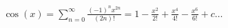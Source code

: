 \documentclass[preview]{standalone}
\begin{document}
\begin{align*}
\cos(x) = \sum_{n=0}^{\infty} \frac{(-1)^n x^{2n}}{(2n)!} = 1-\frac{x^2}{2!}+\frac{x^4}{4!}-\frac{x^6}{6!}+c\dots
\end{align*}
\end{document}
